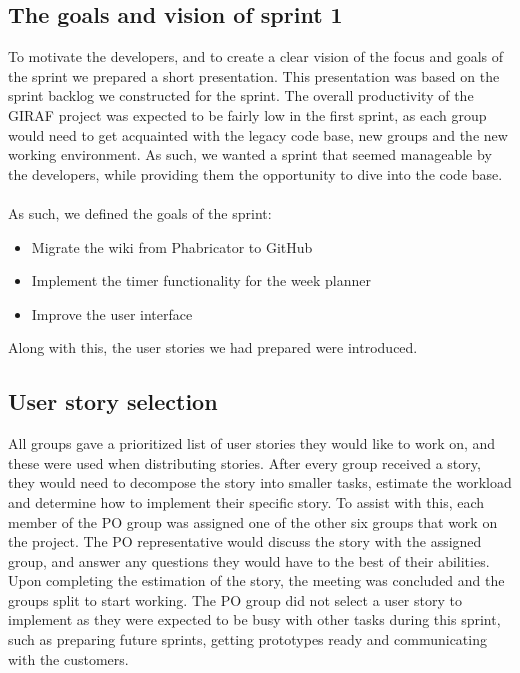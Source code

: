 \subsection{The goals and vision of sprint 1}
To motivate the developers, and to create a clear vision of the focus and goals of the sprint we prepared a short presentation.
This presentation was based on the sprint backlog we constructed for the sprint.
The overall productivity of the GIRAF project was expected to be fairly low in the first sprint, as each group would need to get acquainted with the legacy code base, new groups and the new working environment.
As such, we wanted a sprint that seemed manageable by the developers, while providing them the opportunity to dive into the code base.
\\\\
As such, we defined the goals of the sprint:
\begin{itemize}
    \item Migrate the wiki from Phabricator to GitHub
    \item Implement the timer functionality for the week planner
    \item Improve the user interface
\end{itemize}
Along with this, the user stories we had prepared were introduced.

\subsection{User story selection}
All groups gave a prioritized list of user stories they would like to work on, and these were used when distributing stories.
After every group received a story, they would need to decompose the story into smaller tasks, estimate the workload and determine how to implement their specific story.
To assist with this, each member of the PO group was assigned one of the other six groups that work on the project. 
The PO representative would discuss the story with the assigned group, and answer any questions they would have to the best of their abilities.
Upon completing the estimation of the story, the meeting was concluded and the groups split to start working.
The PO group did not select a user story to implement as they were expected to be busy with other tasks during this sprint, such as preparing future sprints, getting prototypes ready and communicating with the customers.
